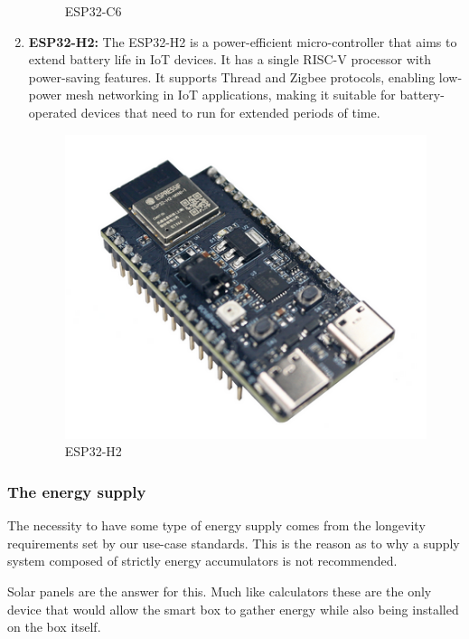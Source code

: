 \documentclass[11pt]{article}
\begin{document}
\begin{enumerate}
\begin{figure}[ht]
        \caption{ESP32-C6}
        \label{fig:ESP32-C6}
    \end{figure}
    \item \textbf{ESP32-H2:} The ESP32-H2 is a power-efficient micro-controller that aims to extend battery life in IoT devices. It has a single RISC-V processor with power-saving features. It supports Thread and Zigbee protocols, enabling low-power mesh networking in IoT applications, making it suitable for battery-operated devices that need to run for extended periods of time.
    \begin{figure}[ht]
        \centering
        \includegraphics[scale = 0.18]{ESP32-H2.png}
        \caption{ESP32-H2}
        \label{fig:ESP32-H2}
    \end{figure}
\end{enumerate}

\subsubsection{The energy supply}
The necessity to have some type of energy supply comes from the longevity requirements set by our use-case standards. This is the reason as to why a supply system composed of strictly energy accumulators is not recommended. \par
\vspace{0.5 cm}

Solar panels are the answer for this. Much like calculators these are the only device that would allow the smart box to gather energy while also being installed on the box itself. \par
\vspace{0.5 cm}
\end{document}
